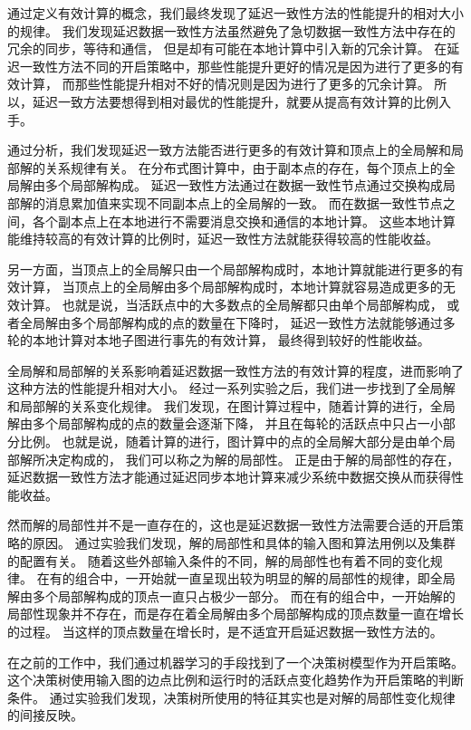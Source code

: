 通过定义有效计算的概念，我们最终发现了延迟一致性方法的性能提升的相对大小的规律。
我们发现延迟数据一致性方法虽然避免了急切数据一致性方法中存在的冗余的同步，等待和通信，
但是却有可能在本地计算中引入新的冗余计算。
在延迟一致性方法不同的开启策略中，那些性能提升更好的情况是因为进行了更多的有效计算，
而那些性能提升相对不好的情况则是因为进行了更多的冗余计算。
所以，延迟一致方法要想得到相对最优的性能提升，就要从提高有效计算的比例入手。

通过分析，我们发现延迟一致方法能否进行更多的有效计算和顶点上的全局解和局部解的关系规律有关。
在分布式图计算中，由于副本点的存在，每个顶点上的全局解由多个局部解构成。
延迟一致性方法通过在数据一致性节点通过交换构成局部解的消息累加值来实现不同副本点上的全局解的一致。
而在数据一致性节点之间，各个副本点上在本地进行不需要消息交换和通信的本地计算。
这些本地计算能维持较高的有效计算的比例时，延迟一致性方法就能获得较高的性能收益。

另一方面，当顶点上的全局解只由一个局部解构成时，本地计算就能进行更多的有效计算，
当顶点上的全局解由多个局部解构成时，本地计算就容易造成更多的无效计算。
也就是说，当活跃点中的大多数点的全局解都只由单个局部解构成，
或者全局解由多个局部解构成的点的数量在下降时，
延迟一致性方法就能够通过多轮的本地计算对本地子图进行事先的有效计算，
最终得到较好的性能收益。


全局解和局部解的关系影响着延迟数据一致性方法的有效计算的程度，进而影响了这种方法的性能提升相对大小。
经过一系列实验之后，我们进一步找到了全局解和局部解的关系变化规律。
我们发现，在图计算过程中，随着计算的进行，全局解由多个局部解构成的点的数量会逐渐下降，
并且在每轮的活跃点中只占一小部分比例。
也就是说，随着计算的进行，图计算中的点的全局解大部分是由单个局部解所决定构成的，
我们可以称之为解的局部性。
正是由于解的局部性的存在，延迟数据一致性方法才能通过延迟同步本地计算来减少系统中数据交换从而获得性能收益。

然而解的局部性并不是一直存在的，这也是延迟数据一致性方法需要合适的开启策略的原因。
通过实验我们发现，解的局部性和具体的输入图和算法用例以及集群的配置有关。
随着这些外部输入条件的不同，解的局部性也有着不同的变化规律。
在有的组合中，一开始就一直呈现出较为明显的解的局部性的规律，即全局解由多个局部解构成的顶点一直只占极少一部分。
而在有的组合中，一开始解的局部性现象并不存在，而是存在着全局解由多个局部解构成的顶点数量一直在增长的过程。
当这样的顶点数量在增长时，是不适宜开启延迟数据一致性方法的。

在之前的工作中，我们通过机器学习的手段找到了一个决策树模型作为开启策略。
这个决策树使用输入图的边点比例和运行时的活跃点变化趋势作为开启策略的判断条件。
通过实验我们发现，决策树所使用的特征其实也是对解的局部性变化规律的间接反映。


